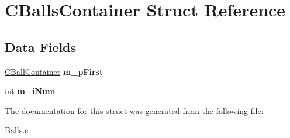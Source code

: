 \hypertarget{struct_c_balls_container}{}\section{C\+Balls\+Container Struct Reference}
\label{struct_c_balls_container}
\subsection*{Data Fields}
\begin{DoxyCompactItemize}
\item 
\mbox{\label{struct_c_balls_container_ae879293db09f6778de3ba3f93e40316b}} 
\hyperlink{struct_c_ball_container}{C\+Ball\+Container} {\bfseries m\+\_\+p\+First}
\item 
\mbox{\label{struct_c_balls_container_a45220943532242cd27ecb24011526a06}} 
int {\bfseries m\+\_\+i\+Num}
\end{DoxyCompactItemize}


The documentation for this struct was generated from the following file\+:\begin{DoxyCompactItemize}
\item 
Balls.\+c\end{DoxyCompactItemize}

